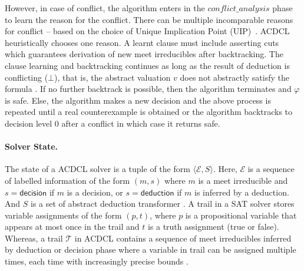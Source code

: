 However, in case of \textsf{conflict}, the algorithm enters in the
$\mathit{conflict\_analysis}$ phase to learn the reason for the
conflict.  There can be multiple incomparable reasons for conflict --
based on the choice of Unique Implication Point (UIP)~\cite{cdcl}.
ACDCL heuristically chooses one reason.  A learnt clause must include
asserting cuts which guarantees derivation of new meet irreducibles
after backtracking. The clause learning and backtracking continues as
long as the result of deduction is conflicting ($\bot$), that is, the
abstract valuation $v$ does not abstractly satisfy the formula
.  If no further backtrack is possible, then the
algorithm terminates and $\varphi$ is \textsf{safe}. Else, the
algorithm makes a new decision and the above process is repeated until
a real counterexample  is obtained or the
algorithm backtracks to decision level 0 after a conflict in which
case it returns \textsf{safe}.

\paragraph{Solver State.}   The state of a ACDCL solver is a tuple 
of the form $\langle \mathcal{E}, S \rangle$.  Here, $\mathcal{E}$ 
is a sequence of labelled information of the form $(m,s)$ where 
$m$ is a meet irreducible and $s = \mathsf{decision}$ if $m$ is a decision, 
or $s = \mathsf{deduction}$ if $m$ is inferred by a deduction. And $S$ is 
a set of abstract deduction transformer .  A trail in a SAT solver 
stores variable assignments of the form $(p, t)$, where $p$ is 
a propositional variable that appears at most once in the trail 
and $t$ is a truth assignment (true or false).  Whereas, a trail 
$\mathcal{T}$ in ACDCL contains a sequence of meet irreducibles 
inferred by deduction or decision phase where a variable in trail 
can be assigned  multiple times, each time with increasingly precise 
bounds .  
